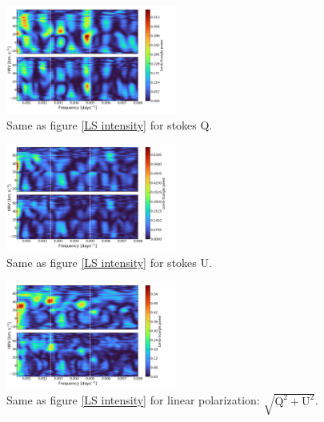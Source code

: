 \documentclass{aa}
\begin{document}
\begin{figure}[!h]
    \centering
    \includegraphics[width=0.5\textwidth]{Lomb-Scargle Stokes Q.png}
    \caption{Same as figure \ref{LS intensity} for stokes Q. }
    \label{LS Q}
\end{figure}

\begin{figure}[!h]
    \centering
    \includegraphics[width=0.5\textwidth]{Lomb-Scargle Stokes U.png}
    \caption{Same as figure \ref{LS intensity} for stokes U.}
    \label{LS U}
\end{figure}


\begin{figure}[!h]
    \centering
    \includegraphics[width=0.5\textwidth]{Lomb-Scargle linear polarization.png}
    \caption{Same as figure \ref{LS intensity} for linear polarization: $\sqrt{\mathrm{Q^2}+\mathrm{U^2}}$.}
    \label{LS linear polarization}
\end{figure}



\end{document}

